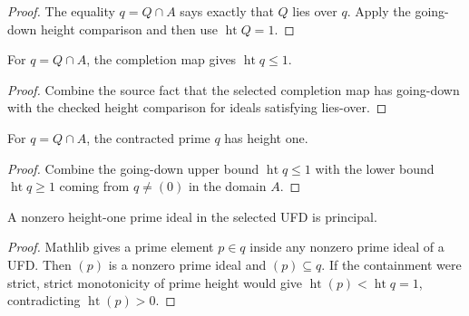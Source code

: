 \begin{proof}
  The equality \(q=Q\cap A\) says exactly that \(Q\) lies over \(q\).  Apply
  the going-down height comparison and then use
  \(\operatorname{ht}Q=1\).
\end{proof}

\begin{lemma}
  \label{lem:contracted_prime_height_le_one_source}
  For \(q=Q\cap A\), the completion map gives
  \(\operatorname{ht}q\leq 1\).
\end{lemma}

\begin{proof}
  Combine the source fact that the selected completion map has going-down with
  the checked height comparison for ideals satisfying lies-over.
\end{proof}

\begin{lemma}
  \label{lem:contracted_prime_height_one_source}
  For \(q=Q\cap A\), the contracted prime \(q\) has height one.
\end{lemma}

\begin{proof}
  Combine the going-down upper bound \(\operatorname{ht}q\leq1\) with the
  lower bound \(\operatorname{ht}q\geq1\) coming from \(q\neq(0)\) in the
  domain \(A\).
\end{proof}

\begin{lemma}
  \label{lem:height_one_prime_principal_ufd_source}
  A nonzero height-one prime ideal in the selected UFD is principal.
\end{lemma}

\begin{proof}
  Mathlib gives a prime element \(p\in q\) inside any nonzero prime ideal of a
  UFD.  Then \((p)\) is a nonzero prime ideal and \((p)\subseteq q\).  If the
  containment were strict, strict monotonicity of prime height would give
  \(\operatorname{ht}(p)<\operatorname{ht}q=1\), contradicting
  \(\operatorname{ht}(p)>0\).
\end{proof}

